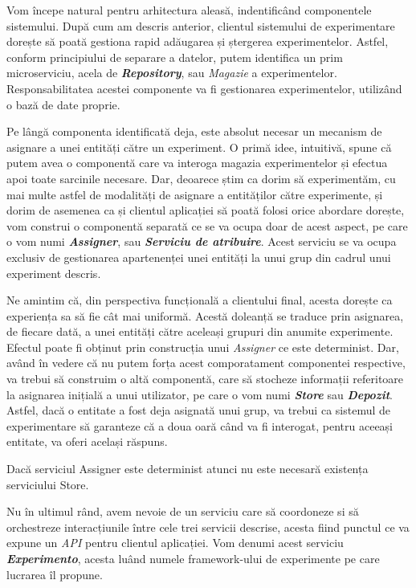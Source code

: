 Vom începe natural pentru arhitectura aleasă, indentificând componentele sistemului. După cum am descris anterior, clientul sistemului de experimentare dorește să poată gestiona rapid adăugarea și ștergerea experimentelor. Astfel, conform principiului de separare a datelor, putem identifica un prim microserviciu, acela de \textbf{\textit{Repository}}, sau \textit{Magazie} a experimentelor. Responsabilitatea acestei componente va fi gestionarea experimentelor, utilizând o bază de date proprie.

Pe lângă componenta identificată deja, este absolut necesar un mecanism de asignare a unei entități către un experiment. O primă idee, intuitivă, spune că putem avea o componentă care va interoga magazia experimentelor și efectua apoi toate sarcinile necesare. Dar, deoarece știm ca dorim să experimentăm, cu mai multe astfel de modalități de asignare a entităților către experimente, și dorim de asemenea ca și clientul aplicației să poată folosi orice abordare dorește, vom construi o componentă separată ce se va ocupa doar de acest aspect, pe care o vom numi  \textit{\textbf{Assigner}}, sau \textbf{\textit{Serviciu de atribuire}}. Acest serviciu se va ocupa exclusiv de gestionarea apartenenței unei entități la unui grup din cadrul unui experiment descris.

Ne amintim că, din perspectiva funcțională a clientului final, acesta dorește ca experiența sa să fie cât mai uniformă. Acestă doleanță se traduce prin asignarea, de fiecare dată, a unei entități către aceleași grupuri din anumite experimente. Efectul poate fi obținut prin construcția unui \textit{Assigner} ce este determinist. Dar, având în vedere că nu putem forța acest comporatament componentei respective, va trebui să construim o altă componentă, care să stocheze informații referitoare la asignarea inițială a unui utilizator, pe care o vom numi  \textit{\textbf{Store}} sau \textbf{\textit{Depozit}}. Astfel, dacă o entitate a fost deja asignată unui grup, va trebui ca sistemul de experimentare să garanteze că a doua oară când va fi interogat, pentru aceeași entitate, va oferi același răspuns.

\begin{remark}
	Dacă serviciul Assigner este determinist atunci nu este necesară existența serviciului Store. 
\end{remark}

Nu în ultimul rând, avem nevoie de un serviciu care să coordoneze si să orchestreze interacțiunile între cele trei servicii descrise, acesta fiind punctul ce va expune un \textit{API} pentru clientul aplicației. Vom denumi acest serviciu  \textit{\textbf{Experimento}}, acesta luând numele framework-ului de experimente pe care lucrarea îl propune. 

